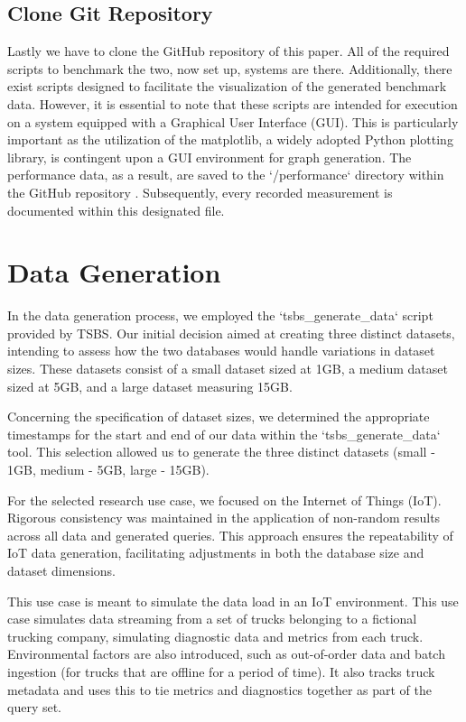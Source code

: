 \documentclass[conference]{IEEEtran}
\begin{document}
\subsection{Clone Git Repository}
Lastly we have to clone the GitHub repository \cite{b2} of this paper. All of the required scripts  to benchmark the two, now set up, systems are there. Additionally, there exist scripts designed to facilitate the visualization of the generated benchmark data. However, it is essential to note that these scripts are intended for execution on a system equipped with a Graphical User Interface (GUI). This is particularly important as the utilization of the matplotlib, a widely adopted Python plotting library, is contingent upon a GUI environment for graph generation. The performance data, as a result, are saved to the `/performance` directory within the GitHub repository \cite{b2}. Subsequently, every recorded measurement is documented within this designated file.

\section{Data Generation}

In the data generation process, we employed the `tsbs\_generate\_data` script provided by TSBS. Our initial decision aimed at creating three distinct datasets, intending to assess how the two databases would handle variations in dataset sizes. These datasets consist of a small dataset sized at 1GB, a medium dataset sized at 5GB, and a large dataset measuring 15GB.

Concerning the specification of dataset sizes, we determined the appropriate timestamps for the start and end of our data within the `tsbs\_generate\_data` tool. This selection allowed us to generate the three distinct datasets (small - 1GB, medium - 5GB, large - 15GB).

For the selected research use case, we focused on the Internet of Things (IoT). Rigorous consistency was maintained in the application of non-random results across all data and generated queries. This approach ensures the repeatability of IoT data generation, facilitating adjustments in both the database size and dataset dimensions.

This use case is meant to simulate the data load in an IoT environment. This use case simulates data streaming from a set of trucks belonging to a fictional trucking company, simulating diagnostic data and metrics from each truck. Environmental factors are also introduced, such as out-of-order data and batch ingestion (for trucks that are offline for a period of time). It also tracks truck metadata and uses this to tie metrics and diagnostics together as part of the query set.
\end{document}
